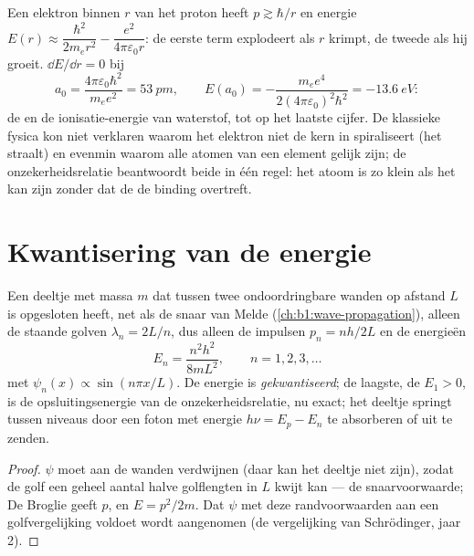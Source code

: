 \begin{example}\label{ex:b1:quantum-introduction:hsize}
Een elektron binnen $r$ van het proton heeft $p \gtrsim \hbar/r$ en energie
$E(r) \approx \dfrac{\hbar^2}{2m_er^2} - \dfrac{e^2}{4\pi\varepsilon_0r}$: de eerste
term explodeert als $r$ krimpt, de tweede als hij groeit. $\dd E/\dd r = 0$ bij
\[
a_0 = \frac{4\pi\varepsilon_0\hbar^2}{m_ee^2} = \qty{53}{pm} , \qquad
E(a_0) = -\frac{m_ee^4}{2(4\pi\varepsilon_0)^2\hbar^2} = \qty{-13.6}{eV} :
\]
de \emph{} en de ionisatie-energie van waterstof, tot op het
laatste cijfer. De klassieke fysica kon niet verklaren waarom het elektron niet
de kern in spiraliseert (het straalt) en evenmin waarom alle atomen van een
element gelijk zijn; de onzekerheidsrelatie beantwoordt beide in één
regel: het atoom is zo klein als het kan zijn zonder dat de 
de binding overtreft.
\end{example}

\section{Kwantisering van de energie}

\begin{proposition}\label{prop:b1:quantum-introduction:box}
Een deeltje met massa $m$ dat tussen twee ondoordringbare wanden op afstand
$L$ is opgesloten heeft, net als de snaar van Melde
(\cref{ch:b1:wave-propagation}), alleen de staande golven $\lambda_n = 2L/n$,
dus alleen de impulsen $p_n = nh/2L$ en de energieën
\[
E_n = \frac{n^2h^2}{8mL^2} , \qquad n = 1, 2, 3, \ldots
\]
met  $\psi_n(x) \propto \sin(n\pi x/L)$. De energie is
\emph{gekwantiseerd}; de laagste, de \emph{} $E_1 > 0$, is de
opsluitingsenergie van de onzekerheidsrelatie, nu exact; het
deeltje springt tussen niveaus door een foton met energie
$h\nu = E_p - E_n$ te absorberen of uit te zenden.
\end{proposition}

\begin{proof}
$\psi$ moet aan de wanden verdwijnen (daar kan het deeltje niet zijn), zodat de
golf een geheel aantal halve golflengten in $L$ kwijt kan --- de
snaarvoorwaarde; De Broglie geeft $p$, en $E = p^2/2m$. Dat $\psi$ met deze
randvoorwaarden aan een golfvergelijking voldoet wordt aangenomen (de
vergelijking van Schrödinger, jaar 2).
\end{proof}

